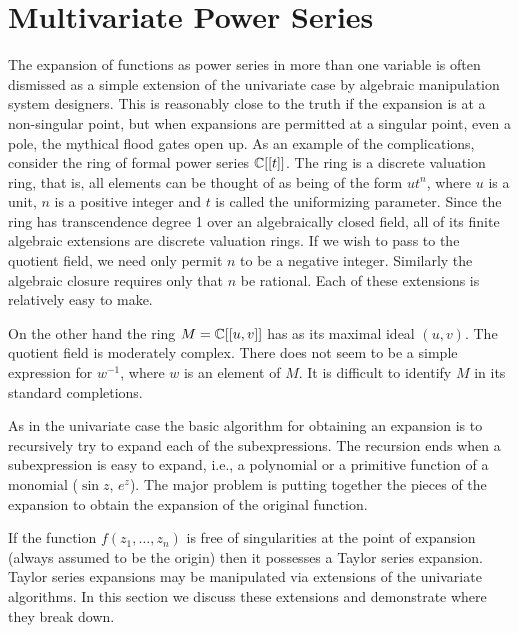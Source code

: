 \section{Multivariate Power Series}
\label{MV:Series:Sec}

The expansion of functions as power series in more than
one variable is often dismissed as a simple extension of the 
univariate case by algebraic manipulation system designers.
This is reasonably close to the truth if the expansion is at a
non-singular point, but when expansions are permitted at a
singular point, even a pole, the mythical flood gates open
up.  As an example of the complications,
consider the ring of formal power series
$\mathbb{C}[[t]]$.  The ring is a discrete valuation ring, that is,
all elements can be thought of as being of the form $u t^n$,
where $u$ is a unit, $n$ is a positive integer and $t$
is called the uniformizing parameter.  Since the ring has
transcendence degree 1 over an algebraically closed field,
all of its finite algebraic extensions are discrete valuation
rings.  If we
wish to pass to the quotient field, we need only permit $n$ to
be a negative integer.  Similarly the algebraic closure
requires only that $n$ be rational.  Each of these extensions is
relatively easy to make.

On the other hand the ring $M = \mathbb{C}[[u,v]]$
has as its maximal ideal $(u, v)$. The quotient field is 
moderately complex.  There does not seem to be 
a simple expression for $w^{-1}$, where $w$ is an element of
$M$.  It is difficult to identify $M$ in its standard
completions.

As in the univariate case the basic algorithm for obtaining
an expansion is to recursively try to expand each of the subexpressions.
The recursion ends when a subexpression is easy to expand, i.e.,
a polynomial or a primitive function of a monomial ($\sin z$, $e^z$).
The major problem is putting together the pieces of the expansion to
obtain the expansion of the original function.

If the function $f(z_1, \ldots , z_n)$ is free of singularities at
the point of expansion (always assumed to be the origin) then it possesses 
a Taylor series expansion.  Taylor series expansions may be manipulated
via extensions of the univariate algorithms.  In this
section we discuss these extensions and demonstrate where they
break down.

